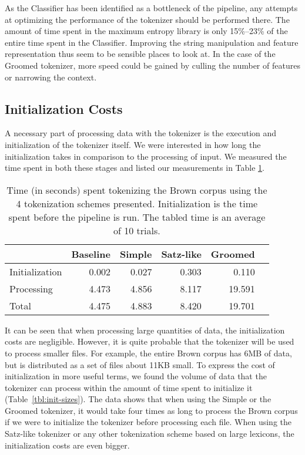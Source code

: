 As the Classifier has been identified as a bottleneck of the pipeline, any
attempts at optimizing the performance of the tokenizer should be performed
there. The amount of time spent in the maximum entropy library is only
15\%--23\% of the entire time spent in the Classifier. Improving the string
manipulation and feature representation thus seem to be sensible places to look
at. In the case of the Groomed tokenizer, more speed could be gained by culling
the number of features or narrowing the context.

\subsection{Initialization Costs}
\label{ssec:eval-spd-init}

A necessary part of processing data with the tokenizer is the execution and
initialization of the tokenizer itself. We were interested in how long the
initialization takes in comparison to the processing of input. We measured the
time spent in both these stages and listed our measurements in Table
\ref{tbl:timeline}.

\begin{table}
  \begin{center}
    \begin{tabular}{ | l | r | r | r | r | r | }
      \hline
      & Baseline & Simple & Satz-like & Groomed \\ \hline
      Initialization & 0.002 & 0.027 & 0.303 & 0.110 \\ \hline
      Processing & 4.473 & 4.856 & 8.117 & 19.591 \\ \hline
      Total & 4.475 & 4.883 & 8.420 & 19.701 \\
      \hline
    \end{tabular}
  \end{center}
  \caption[Time spent in individual initialization steps]
    {Time (in seconds) spent tokenizing the Brown corpus using the 4
    tokenization schemes presented. Initialization is the time spent before the
    pipeline is run. The tabled time is an average of 10 trials.}
  \label{tbl:timeline}
\end{table}

It can be seen that when processing large quantities of data, the
initialization costs are negligible. However, it is quite probable that the
tokenizer will be used to process smaller files. For example, the entire Brown
corpus has 6MB of data, but is distributed as a set of files about 11KB small.
To express the cost of initialization in more useful terms, we found the volume
of data that the tokenizer can process within the amount of time spent to
initialize it (Table~\ref{tbl:init-sizes}). The data shows that when using the
Simple or the Groomed tokenizer, it would take four times as long to process
the Brown corpus if we were to initialize the tokenizer before processing each
file. When using the Satz-like tokenizer or any other tokenization scheme based
on large lexicons, the initialization costs are even bigger.

